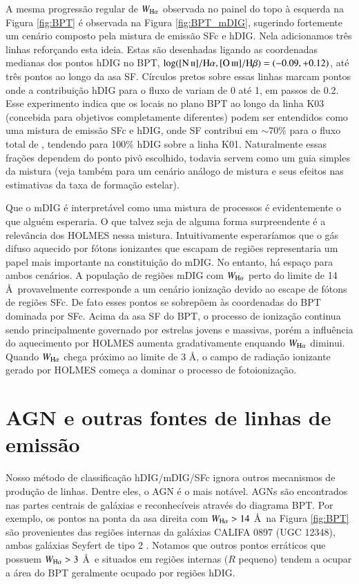 A mesma progressão regular de $W_{\Ha}$ observada no painel do topo à esquerda na Figura \ref{fig:BPT} é observada na Figura \ref{fig:BPT_mDIG}, sugerindo fortemente um cenário composto pela mistura de emissão SFc e hDIG. Nela adicionamos três linhas reforçando esta ideia. Estas são desenhadas ligando as coordenadas medianas dos pontos hDIG no BPT, $\log(\nii/\Ha,\oiii/\Hb) = (-0.09,+0.12)$, até três pontos ao longo da asa SF. Círculos pretos sobre essas linhas marcam pontos onde a contribuição hDIG para o fluxo de \Ha variam de 0 até 1, em passos de 0.2. Esse experimento indica que os locais no plano BPT ao longo da linha K03 (concebida para objetivos completamente diferentes) podem ser entendidos como uma mistura de emissão SFc e hDIG, onde SF contribui em $\sim 70\%$ para o fluxo total de \Ha, tendendo para 100\% hDIG sobre a linha K01. Naturalmente essas frações dependem do ponto pivô escolhido, todavia servem como um guia simples da mistura (veja também \citealt{Blanc.etal.2009} para um cenário análogo de mistura e seus efeitos nas estimativas da taxa de formação estelar).

Que o mDIG é interpretável como uma mistura de processos é evidentemente o que alguém esperaria. O que talvez seja de alguma forma surpreendente é a relevância dos HOLMES nessa mistura. Intuitivamente esperaríamos que o gás difuso aquecido por fótons ionizantes que escapam de regiões \hii representaria um papel mais importante na constituição do mDIG. No entanto, há espaço para ambos cenários. A população de regiões mDIG com $W_{\Ha}$ perto do limite de 14 \AA\ provavelmente corresponde a um cenário ionização devido ao escape de fótons de regiões SFc. De fato esses pontos se sobrepõem às coordenadas do BPT dominada por SFc. Acima da asa SF do BPT, o processo de ionização continua sendo principalmente governado por estrelas jovens e massivas, porém a influência do aquecimento por HOLMES aumenta gradativamente enquando $W_{\Ha}$ diminui. Quando $W_{\Ha}$ chega próximo ao limite de 3 \AA, o campo de radiação ionizante gerado por HOLMES começa a dominar o processo de fotoionização.


\section{AGN e outras fontes de linhas de emissão}
\label{sec:DIGdisc:caveats}

Nosso método de classificação hDIG/mDIG/SFc ignora outros mecanismos de produção de linhas. Dentre eles, o AGN é o mais notável. AGNs são encontrados nas partes centrais de galáxias e reconhecíveis através do diagrama BPT. Por exemplo, os pontos na ponta da asa direita com $W_{\Ha} > 14$ \AA\ na Figura \ref{fig:BPT} são provenientes das regiões internas da galáxias CALIFA 0897 (UGC 12348), ambas galáxias  Seyfert de tipo 2 \citep{Cusumano.etal.2010, Asmus.etal.2014}. Notamos que outros pontos erráticos que possuem $W_{\Ha} > 3$ \AA\ e situados em regiões internas ($R$ pequeno) tendem a ocupar a área do BPT geralmente ocupado por regiões hDIG.

